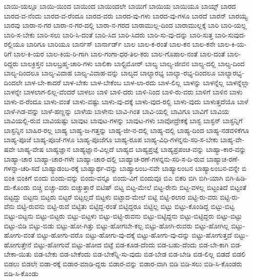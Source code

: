 {ಬಾಯಿ-ಯಲ್ಲೂ
ಬಾಯಿ-ಯಿಂದ
ಬಾಯಿಂದ
ಬಾಯಿಂದಲೇ
ಬಾಯಿಗೆ
ಬಾಯಿಯ
ಬಾಯಿಯೂ
ಬಾಯ್ಸ್
ಬಾರದ
ಬಾರದ-ವ-ನೆಂದು
ಬಾರದ-ವ-ರೆಂದೂ
ಬಾರದ-ವರು
ಬಾರದ-ವು-ಗಳು
ಬಾರದ-ವು-ಗಳೂ
ಬಾರದೆ
ಬಾರನ್
ಬಾರಯ್ಯ
ಬಾರವು
ಬಾರಾ-ನ-ಗರ
ಬಾರಾ-ನ-ಗರ-ದಲ್ಲಿ
ಬಾರಾ-ನ-ಗರದ
ಬಾರಾಮುಲ್ಲ-ದಿಂದ
ಬಾರಾಮುಲ್ಲಕ್ಕೆ
ಬಾರಿ
ಬಾರಿ-ಯಲ್ಲ
ಬಾರಿ-ಸ-ಬೇಕು
ಬಾರಿ-ಸಲು
ಬಾರಿ-ಸಿ-ದಂತೆ
ಬಾರಿ-ಸಿದ
ಬಾರಿ-ಸಿದರು
ಬಾರಿ-ಸು-ವು-ದನ್ನು
ಬಾರಿ-ಸುತ್ತ
ಬಾರಿ-ಸುವುದ-ರಲ್ಲಿಯೂ
ಬಾರಿಗೂ
ಬಾರಿಯೂ
ಬಾರ್ನಸ್
ಬಾರ್ನಾರ್ಡ್
ಬಾಲ
ಬಾಲ-ಕ-ರಂತೆ
ಬಾಲ-ಕನ
ಬಾಲ-ಕನೇ
ಬಾಲ-ಕಿ-ಯ-ರಿಗೆ
ಬಾಲ-ಕಿ-ಯರ
ಬಾಲ-ಕಿಯ-ರಿ-ಗಾಗಿ
ಬಾಲ-ಗಂಗಾ-ಧರ-ತಿಲ-ಕರು
ಬಾಲ-ಗೊಪಾಲ-ನಂತೆ
ಬಾಲ-ದಂತೆ
ಬಾಲ-ರಿದ್ದರು
ಬಾಲಕ್ರಿಸ್ತನ
ಬಾಲಬ್ರಹ್ಮ-ಚಾರಿ-ಗಳು
ಬಾಲಿಕಾ
ಬಾಲ್ಟಿಮೋರ್
ಬಾಲ್ಯ
ಬಾಲ್ಯ-ಜೀವನ
ಬಾಲ್ಯ-ದಲ್ಲಿ
ಬಾಲ್ಯ-ದಿಂದ
ಬಾಲ್ಯ-ದಿಂದಲೂ
ಬಾಲ್ಯ-ವಿವಾಹ
ಬಾಲ್ಯ-ವಿವಾಹ-ವನ್ನು
ಬಾಲ್ಯದ
ಬಾಲ್ಯಾರಭ್ಯ
ಬಾಲ್ಯಾ-ರಭ್ಯ-ದಿಂದಲೂ
ಬಾಲ್ಯಾರಭ್ಯ-ದಿಂದಲೇ
ಬಾಳ-ಬೇ-ಕಾದರೆ
ಬಾಳ-ಬೇಕು
ಬಾಳ-ಬೇಕೆಂಬ
ಬಾಳ-ಲಾ-ರದು
ಬಾಳ-ಲಿಲ್ಲ
ಬಾಳನ್ನು
ಬಾಳನ್ನೆಲ್ಲ
ಬಾಳನ್ನೆಲ್ಲಾ
ಬಾಳನ್ನೇ
ಬಾಳಲಾಗ-ಲಿಲ್ಲ-ವೆಂದರೆ
ಬಾಳಲು
ಬಾಳಿ
ಬಾಳಿ-ದರು
ಬಾಳಿ-ನಿಂದ
ಬಾಳಿ-ರು-ವರು
ಬಾಳಿಗೆ
ಬಾಳಿನ
ಬಾಳು
ಬಾಳು-ವ-ರೆಂದೂ
ಬಾಳು-ವಂತೆ
ಬಾಳು-ವಷ್ಟು
ಬಾಳು-ವು-ದಕ್ಕೆ
ಬಾಳು-ವುದ-ರಲ್ಲಿ
ಬಾಳು-ವುದು
ಬಾಳುತ್ತದೆಯೊ
ಬಾಳೆ
ಬಾಳೆ-ಗಿಡ-ವನ್ನು
ಬಾಳೆ-ಹಣ್ಣನ್ನು
ಬಾಳೆಯ
ಬಾಳೇನು
ಬಾವಿ-ಗಿಂತ
ಬಾವಿ-ಯಲ್ಲಿ
ಬಾವಿಗೂ
ಬಾವಿಗೆ
ಬಾವಿಯ
ಬಾವಿಯಲ್ಲಿ-ರುವ
ಬಾವಿಯಷ್ಟು
ಬಾವುಟ
ಬಾವುಟ-ಗಳನ್ನು
ಬಾವುಟ-ಗಳು
ಬಾವೋದ್ರೇಕಕ್ಕೆ
ಬಾಸ್ಟ
ಬಾಸ್ಟನ್
ಬಾಸ್ಟನ್ನಿಗೆ
ಬಾಸ್ಟನ್ನಿನ
ಬಾಹಿರ-ರಲ್ಲ
ಬಾಹ್ಯ
ಬಾಹ್ಯ-ಜ-ಗತ್ತನ್ನು
ಬಾಹ್ಯ-ಜೀ-ನ-ದಲ್ಲಿ
ಬಾಹ್ಯ-ದಲ್ಲಿ
ಬಾಹ್ಯ-ದಿಂದ
ಬಾಹ್ಯ-ನಡವಳಿಕೆಗೂ
ಬಾಹ್ಯ-ಪೂಜೆ
ಬಾಹ್ಯ-ಪೂಜೆ-ಗಳೂ
ಬಾಹ್ಯ-ಪೂಜೆಗೂ
ಬಾಹ್ಯ-ರೂಪ
ಬಾಹ್ಯ-ವಿಧಿ-ಗಳನ್ನನು-ಸರಿ-ಸ-ಬೇಕು
ಬಾಹ್ಯ-ವೇ-ಷವೇ
ಬಾಹ್ಯ-ವೇಷ
ಬಾಹ್ಯಜ್ಞಾನ
ಬಾಹ್ಯಜ್ಞಾನ-ವಿಲ್ಲದೆ
ಬಾಹ್ಯದ
ಬಾಹ್ಯಪ್ರಜ್ಞೆ
ಬಾಹ್ಯಪ್ರಪಂಚ-ವನ್ನು
ಬಾಹ್ಯಾ-ಕಾರ-ವನ್ನು
ಬಾಹ್ಯಾ-ಚಾರ
ಬಾಹ್ಯಾ-ಚಾರ-ಗಳೇ
ಬಾಹ್ಯಾ-ಚಾರ-ದಲ್ಲಿ
ಬಾಹ್ಯಾಚ-ರಣೆ-ಗಳನ್ನನು-ಸರಿ-ಸ-ದಿ-ರುವ
ಬಾಹ್ಯಾಚ-ರಣೆ-ಗಳನ್ನಾ-ಚರಿ-ಸದೆ
ಬಾಹ್ಯಾಡಂಬ-ರಕ್ಕೆ
ಬಾಹ್ಯಾರ್ಥ-ವನ್ನು
ಬಾಹ್ಯಾಲಂಬ-ನವೇ
ಬಾಹ್ಯಾಲಂಬನ
ಬಾಹ್ಯಾಲಂಬನ-ವನ್ನೇ
ಬಿ
ಬಿಂಕಿ
ಬಿಂಕಿಗೆ
ಬಿಂದು
ಬಿಂದು-ವನ್ನು
ಬಿಂದು-ವನ್ನೂ
ಬಿಂದು-ವಿಗೆ
ಬಿಂದುವೂ
ಬಿಎ
ಬಿಕರಿ
ಬಿಗಿ
ಬಿಗಿ-ಯಾಗಿ
ಬಿಗಿ-ಹಿಡಿ-ದು-ಕೊಂಡು
ಬಿಚ್ಚಿ
ಬಿಚ್ಚು-ವರು
ಬಿಚ್ಚುತ್ತಾರೆ
ಬಿಟಿಷ್
ಬಿಟ್ಟ
ಬಿಟ್ಟ-ಮೇಲೆ
ಬಿಟ್ಟ-ರೇನು
ಬಿಟ್ಟ-ವಳಲ್ಲ
ಬಿಟ್ಟಂತಿದೆ
ಬಿಟ್ಟಂತೆ
ಬಿಟ್ಟದ್ದು
ಬಿಟ್ಟನು
ಬಿಟ್ಟರು
ಬಿಟ್ಟರೆ
ಬಿಟ್ಟಲ್ಲದೆ
ಬಿಟ್ಟಳು
ಬಿಟ್ಟಾದ-ಮೇಲೆ
ಬಿಟ್ಟಿ
ಬಿಟ್ಟಿ-ರಲಾರ
ಬಿಟ್ಟಿ-ರು-ವರು
ಬಿಟ್ಟಿ-ರು-ವೆನು
ಬಿಟ್ಟಿ-ರುವನು
ಬಿಟ್ಟಿ-ರುವೆ
ಬಿಟ್ಟಿತು
ಬಿಟ್ಟಿದ್ದ-ರಂತೆ
ಬಿಟ್ಟಿದ್ದರೂ
ಬಿಟ್ಟಿಲ್ಲ
ಬಿಟ್ಟು
ಬಿಟ್ಟು-ಕೊಂಡಿದ್ದ
ಬಿಟ್ಟು-ಬಿಟ್ಟ
ಬಿಟ್ಟು-ಬಿಟ್ಟನು
ಬಿಟ್ಟು-ಬಿಟ್ಟರು
ಬಿಟ್ಟು-ಬಿಟ್ಟಳು
ಬಿಟ್ಟು-ಬಿಟ್ಟಿ-ರುವನು
ಬಿಟ್ಟು-ಬಿಟ್ಟಿದ್ದನು
ಬಿಟ್ಟು-ಬಿಟ್ಟಿದ್ದರು
ಬಿಟ್ಟು-ಬಿಟ್ಟು
ಬಿಟ್ಟು-ಬಿಡಿ
ಬಿಟ್ಟು-ಬಿಡು
ಬಿಟ್ಟು-ಹೋ-ಗಿತ್ತು
ಬಿಟ್ಟು-ಹೋಗಬೇ-ಕಲ್ಲ
ಬಿಟ್ಟು-ಹೋಗಿ-ರುವರು
ಬಿಟ್ಟು-ಹೋಗಿಲ್ಲ
ಬಿಟ್ಟು-ಹೋಗು-ವಂತೆ
ಬಿಟ್ಟು-ಹೋಗು-ವರೊ
ಬಿಟ್ಟು-ಹೋಗು-ವು-ದಕ್ಕೆ
ಬಿಟ್ಟು-ಹೋಗು-ವು-ದನ್ನು
ಬಿಟ್ಟು-ಹೋಗುತ್ತದೆ
ಬಿಟ್ಟು-ಹೋಗುತ್ತೇನೆ
ಬಿಟ್ಟು-ಹೋಗುವೆ
ಬಿಟ್ಟು-ಹೋದ
ಬಿಟ್ಟೆ
ಬಿಡ-ಕೂಡ-ದೆಂದು
ಬಿಡ-ಬಹು-ದೆಂದು
ಬಿಡ-ಬೇ-ಕಾಗಿ
ಬಿಡ-ಬೇಕಾ-ಯಿತು
ಬಿಡ-ಬೇಕು
ಬಿಡ-ಬೇಕೆಂದು
ಬಿಡ-ಬೇಕೆನ್ನಿ-ಸು-ವುದು
ಬಿಡ-ಬೇಡ
ಬಿಡ-ಬೇಡಿ
ಬಿಡ-ಲಿಲ್ಲ
ಬಿಡದೆ
ಬಿಡಲಿ
ಬಿಡಲು
ಬಿಡಲೇ
ಬಿಡಾ-ರಕ್ಕೆ
ಬಿಡಾರ-ಮಾಡಿ-ದ್ದರು
ಬಿಡಾರ-ವನ್ನು
ಬಿಡಾರ-ವಾಗಿ
ಬಿಡಿ
ಬಿಡಿ-ಸಲು
ಬಿಡಿ-ಸಿ-ಕೊಂಡರು
ಬಿಡಿ-ಸಿ-ಕೊಂಡು
}
